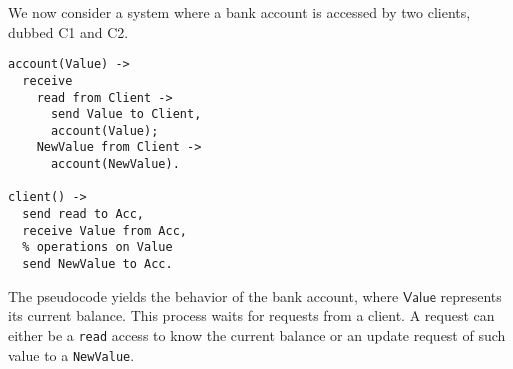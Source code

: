 We now consider a system where a bank account is accessed
by two clients, dubbed C1 and C2.
% 

\begin{lstlisting}
account(Value) ->
  receive
    read from Client ->
      send Value to Client,
      account(Value);
    NewValue from Client ->
      account(NewValue).

client() ->
  send read to Acc,
  receive Value from Acc,
  % operations on Value
  send NewValue to Acc.
\end{lstlisting}

The pseudocode yields the behavior of the bank account,
where $\mathsf{Value}$ represents its current balance.
%
This process waits for requests from a client.
%
A request can either be a \lstinline{read} access to know
the current balance or an update request of such value to a
\lstinline{NewValue}.


